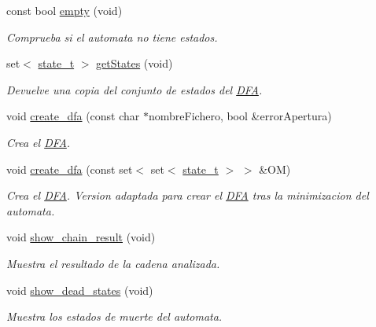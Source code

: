 \begin{DoxyCompactItemize}
const bool \hyperlink{class_d_f_a_a165a6e75da0c003a78ddf437ef26169e}{empty} (void)
\begin{DoxyCompactList}\small\item\em Comprueba si el automata no tiene estados. \end{DoxyCompactList}\item 
set$<$ \hyperlink{classstate__t}{state\+\_\+t} $>$ \hyperlink{class_d_f_a_a4fd523c42b2981f0353d9a3df1771d9e}{get\+States} (void)
\begin{DoxyCompactList}\small\item\em Devuelve una copia del conjunto de estados del \hyperlink{class_d_f_a}{D\+FA}. \end{DoxyCompactList}\item 
void \hyperlink{class_d_f_a_a31d1ae734a752f28753d5fa3031c4f0c}{create\+\_\+dfa} (const char $\ast$nombre\+Fichero, bool \&error\+Apertura)
\begin{DoxyCompactList}\small\item\em Crea el \hyperlink{class_d_f_a}{D\+FA}. \end{DoxyCompactList}\item 
void \hyperlink{class_d_f_a_a06e28de0df3c54afe35ecebe60e88484}{create\+\_\+dfa} (const set$<$ set$<$ \hyperlink{classstate__t}{state\+\_\+t} $>$ $>$ \&OM)
\begin{DoxyCompactList}\small\item\em Crea el \hyperlink{class_d_f_a}{D\+FA}. Version adaptada para crear el \hyperlink{class_d_f_a}{D\+FA} tras la minimizacion del automata. \end{DoxyCompactList}\item 
\mbox{\label{class_d_f_a_a7b3b402a2383507bc7836a8fa8af9371}} 
void \hyperlink{class_d_f_a_a7b3b402a2383507bc7836a8fa8af9371}{show\+\_\+chain\+\_\+result} (void)
\begin{DoxyCompactList}\small\item\em Muestra el resultado de la cadena analizada. \end{DoxyCompactList}\item 
\mbox{\label{class_d_f_a_a311a5c043b5d11ea6ed4f34b8a901310}} 
void \hyperlink{class_d_f_a_a311a5c043b5d11ea6ed4f34b8a901310}{show\+\_\+dead\+\_\+states} (void)
\begin{DoxyCompactList}\small\item\em Muestra los estados de muerte del automata. \end{DoxyCompactList}\item 

\end{DoxyCompactItemize}
